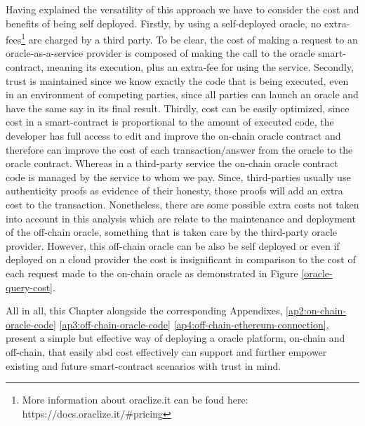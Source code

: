 Having explained the versatility of this approach we have to consider the cost and benefits of being self deployed. Firstly, by using a self-deployed oracle, no extra-fees\footnote{More information about oraclize.it can be foud here: https://docs.oraclize.it/\#pricing} are charged by a third party. To be clear, the cost of making a request to an oracle-as-a-service provider is composed of making the call to the oracle smart-contract, meaning its execution, plus an extra-fee for using the service. Secondly, trust is maintained since we know exactly the code that is being executed, even in an environment of competing parties, since all parties can launch an oracle and have the same say in its final result. Thirdly, cost can be easily optimized, since cost in a smart-contract is proportional to the amount of executed code, the developer has full access to edit and improve the on-chain oracle contract and therefore can improve the cost of each transaction/answer from the oracle to the oracle contract. Whereas in a third-party service the on-chain oracle contract code is managed by the service to whom we pay. Since, third-parties usually use authenticity proofs as evidence of their honesty, those proofs will add an extra cost to the transaction. Nonetheless, there are some possible extra costs not taken into account in this analysis which are relate to the maintenance and deployment of the off-chain oracle, something that is taken care by the third-party oracle provider. However, this off-chain oracle can be also be self deployed or even if deployed on a cloud provider the cost is insignificant in comparison to the cost of each request made to the on-chain oracle as demonstrated in Figure \ref{oracle-query-cost}.

All in all, this Chapter alongside the corresponding Appendixes, \ref{ap2:on-chain-oracle-code} \ref{ap3:off-chain-oracle-code} \ref{ap4:off-chain-ethereum-connection}, present a simple but effective way of deploying a oracle platform, on-chain and off-chain, that easily abd cost effectively can support and further empower existing and future smart-contract scenarios with trust in mind.